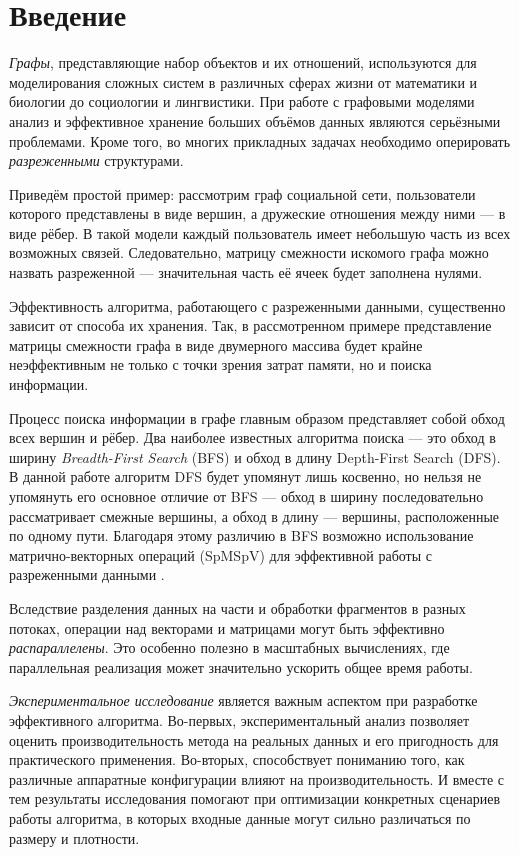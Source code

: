 
\section*{Введение}
\thispagestyle{withCompileDate}

\textit{Графы}, представляющие набор объектов и их отношений, используются для моделирования сложных систем в различных сферах жизни от математики и биологии до социологии и лингвистики. 
При работе с графовыми моделями анализ и эффективное хранение больших объёмов данных являются серьёзными проблемами. Кроме того, во многих прикладных задачах необходимо оперировать \textit{разреженными} структурами. 

Приведём простой пример: рассмотрим граф социальной сети, пользователи которого представлены в виде вершин, а дружеские отношения между ними --- в виде рёбер. В такой модели каждый пользователь имеет небольшую часть из всех возможных связей. Следовательно, матрицу смежности искомого графа можно назвать разреженной --- значительная часть её ячеек будет заполнена нулями. 

Эффективность алгоритма, работающего с разреженными данными, существенно зависит от способа их хранения. Так, в рассмотренном примере представление матрицы смежности графа в виде двумерного массива будет крайне неэффективным не только с точки зрения затрат памяти, но и поиска информации.

Процесс поиска информации в графе главным образом представляет собой обход всех вершин и рёбер. Два наиболее известных алгоритма поиска --- это обход в ширину \textit{Breadth-First Search} (BFS) и обход в длину Depth-First Search (DFS). В данной работе алгоритм DFS будет упомянут лишь косвенно, но нельзя не упомянуть его основное отличие от BFS --- обход в ширину последовательно рассматривает смежные вершины, а обход в длину --- вершины, расположенные по одному пути. Благодаря этому различию в BFS возможно использование матрично-векторных операций (SpMSpV) для эффективной работы с разреженными данными \cite{LinearAlgebra-basedGraphFramework}.

Вследствие разделения данных на части и обработки фрагментов в разных потоках, операции над векторами и матрицами могут быть эффективно \textit{распараллелены}. Это особенно полезно в масштабных вычислениях, где параллельная реализация может значительно ускорить общее время работы.

\textit{Экспериментальное исследование} является важным аспектом при разработке эффективного алгоритма. Во-первых, экспериментальный анализ позволяет оценить производительность метода на реальных данных и его пригодность для практического применения. Во-вторых, способствует пониманию того, как различные аппаратные конфигурации влияют на производительность. И вместе с тем результаты исследования помогают при оптимизации конкретных сценариев работы алгоритма, в которых входные данные могут сильно различаться по размеру и плотности. 